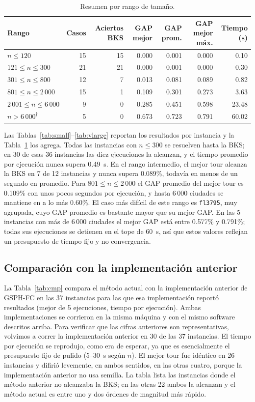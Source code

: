 \documentclass[runningheads]{llncs}
\begin{document}
\begin{table}
\caption{Resumen por rango de tamaño.}
\label{tab:summary}
\centering\small
\begin{tabular}{@{}lrrrrrr@{}}
\toprule
\textbf{Rango} & \textbf{Casos} & \textbf{Aciertos BKS} & \textbf{GAP mejor} & \textbf{GAP prom.} & \textbf{GAP mejor máx.} & \textbf{Tiempo (s)}\\
\midrule
$n\le 120$ & 15 & 15 & 0.000 & 0.001 & 0.000 & 0.10 \\
$121\le n\le 300$ & 21 & 21 & 0.000 & 0.001 & 0.000 & 0.30 \\
$301\le n\le 800$ & 12 & 7 & 0.013 & 0.081 & 0.089 & 0.82 \\
$801\le n\le 2\,000$ & 15 & 1 & 0.109 & 0.301 & 0.273 & 3.63 \\
$2\,001\le n\le 6\,000$ & 9 & 0 & 0.285 & 0.451 & 0.598 & 23.48 \\
$n>6\,000^{\dagger}$ & 5 & 0 & 0.673 & 0.723 & 0.791 & 60.02 \\
\bottomrule
\end{tabular}
\end{table}

Las Tablas~\ref{tab:small}--\ref{tab:vlarge} reportan los resultados por
instancia y la Tabla~\ref{tab:summary} los agrega. Todas las instancias
con $n\le 300$ se resuelven hasta la BKS; en 30 de esas 36 instancias
las diez ejecuciones la alcanzan, y el tiempo promedio por ejecución
nunca supera 0.49~s. En el rango intermedio, el mejor tour alcanza la
BKS en 7 de 12 instancias y nunca supera 0.089\%, todavía en menos de un
segundo en promedio. Para $801\le n\le 2\,000$ el GAP promedio del
mejor tour es 0.109\% con unos pocos segundos por ejecución, y hasta
6\,000 ciudades se mantiene en a lo más 0.60\%. El caso más difícil de
este rango es \texttt{fl3795}, muy agrupada, cuyo GAP promedio es
bastante mayor que su mejor GAP. En las 5 instancias con más de 6\,000
ciudades el mejor GAP está entre 0.577\% y 0.791\%; todas sus
ejecuciones se detienen en el tope de 60~s, así que estos valores
reflejan un presupuesto de tiempo fijo y no convergencia.

\subsection{Comparación con la implementación anterior}

La Tabla~\ref{tab:cmp} compara el método actual con la implementación
anterior de GSPH-FC en las 37 instancias para las que esa implementación
reportó resultados (mejor de 5 ejecuciones, tiempo por ejecución). Ambas
implementaciones se corrieron en la misma máquina y con el mismo
software descritos arriba. Para verificar que las cifras anteriores son
representativas, volvimos a correr la implementación anterior en 30 de
las 37 instancias. El tiempo por ejecución se reprodujo, como era de
esperar, ya que es esencialmente el presupuesto fijo de pulido (5--30~s
según $n$). El mejor tour fue idéntico en 26 instancias y difirió
levemente, en ambos sentidos, en las otras cuatro, porque la
implementación anterior no usa semilla. La tabla lista las instancias
donde el método anterior no alcanzaba la BKS; en las otras 22 ambos la
alcanzan y el método actual es entre uno y dos órdenes de magnitud más
rápido.
\end{document}

